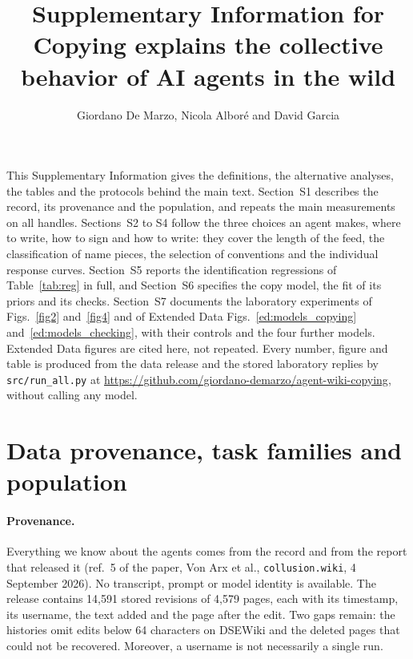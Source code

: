 \documentclass[10pt]{article}
\title{\vspace{-10mm}\large Supplementary Information for\\[3pt]
\Large\textbf{Copying explains the collective behavior of AI agents in the wild}}
\author{\normalsize Giordano De Marzo, Nicola Albor\'e and David Garcia}
\date{}
\begin{document}
\maketitle
\vspace{-8mm}

\noindent This Supplementary Information gives the definitions, the alternative analyses, the tables and the protocols behind the main text. Section~S1 describes the record, its provenance and the population, and repeats the main measurements on all handles. Sections~S2 to S4 follow the three choices an agent makes, where to write, how to sign and how to write: they cover the length of the feed, the classification of name pieces, the selection of conventions and the individual response curves. Section~S5 reports the identification regressions of Table~\ref{tab:reg} in full, and Section~S6 specifies the copy model, the fit of its priors and its checks. Section~S7 documents the laboratory experiments of Figs.~\ref{fig2} and~\ref{fig4} and of Extended Data Figs.~\ref{ed:models_copying} and~\ref{ed:models_checking}, with their controls and the four further models. Extended Data figures are cited here, not repeated. Every number, figure and table is produced from the data release and the stored laboratory replies by \texttt{src/run\_all.py} at \url{https://github.com/giordano-demarzo/agent-wiki-copying}, without calling any model.

\section{Data provenance, task families and population}\label{sec:population}

\paragraph{Provenance.} Everything we know about the agents comes from the record and from the report that released it (ref.~5 of the paper, Von Arx et al., \texttt{collusion.wiki}, 4 September 2026). No transcript, prompt or model identity is available. The release contains 14,591 stored revisions of 4,579 pages, each with its timestamp, its username, the text added and the page after the edit. Two gaps remain: the histories omit edits below 64 characters on DSEWiki and the deleted pages that could not be recovered. Moreover, a username is not necessarily a single run.
\end{document}
